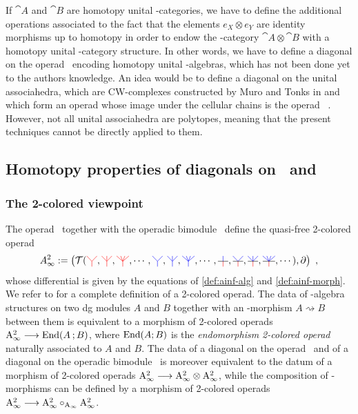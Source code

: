 \documentclass[twoside, 11pt]{amsart}
\theoremstyle{remark}
\begin{document}
If $\cat{A}$ and $\cat{B}$ are homotopy unital \Ainf -categories, we have to define the additional operations associated to the fact that the elements $e_X \otimes e_Y$ are identity morphisms up to homotopy in order to endow the \Ainf -category $\cat{A} \otimes \cat{B}$ with a homotopy unital \Ainf -category structure. In other words, we have to define a diagonal on the operad \uAinf\ encoding homotopy unital \Ainf -algebras, which has not been done yet to the authors knowledge. An idea would be to define a diagonal on the unital associahedra, which are CW-complexes constructed by Muro and Tonks in \cite{MuroTonks} and which form an operad whose image under the cellular chains is the operad \uAinf\ . However, not all unital associahedra are polytopes, meaning that the present techniques cannot be directly applied to them. 

\subsection{Homotopy properties of diagonals on \Ainf\ and \Minf }

\subsubsection{The 2-colored viewpoint}

The operad \Ainf\ together with the operadic bimodule \Minf\ define the quasi-free 2-colored operad 
\[ A_\infty^2 := \left( \mathcal{T} (\arbreopdeuxcol{red} , \arbreoptroiscol{red} , \arbreopquatrecol{red}, \cdots, \arbreopdeuxcol{blue} , \arbreoptroiscol{blue} , \arbreopquatrecol{blue} , \cdots, \arbreopunmorph , \arbreopdeuxmorph , \arbreoptroismorph , \arbreopquatremorph , \cdots )  , \partial \right) \ , \]
whose differential is given by the equations of \cref{def:ainf-alg} and \cref{def:ainf-morph}.
We refer to \cite[Section 11]{yau-colored} for a complete definition of a 2-colored operad.
The data of \Ainf -algebra structures on two dg modules $A$ and $B$ together with an \Ainf -morphism $A \rightsquigarrow B$ between them is equivalent to a morphism of 2-colored operads $\mathrm{A}_\infty^2 \longrightarrow \mathrm{End} ( A \text{\hspace{2pt}} ; B) $, where $\mathrm{End} ( A ; B)$ is the \textit{endomorphism 2-colored operad} naturally associated to $A$ and $B$.
The data of a diagonal on the operad \Ainf\ and of a diagonal on the operadic bimodule \Minf\ is moreover equivalent to the datum of a morphism of 2-colored operads $\mathrm{A}_\infty^2 \longrightarrow \mathrm{A}_\infty^2 \otimes \mathrm{A}_\infty^2$, while the composition of \Ainf -morphisms can be defined by a morphism of 2-colored operads $\mathrm{A}_\infty^2 \longrightarrow \mathrm{A}_\infty^2 \circ_{\mathrm{A}_\infty} \mathrm{A}_\infty^2 $.
\end{document}
